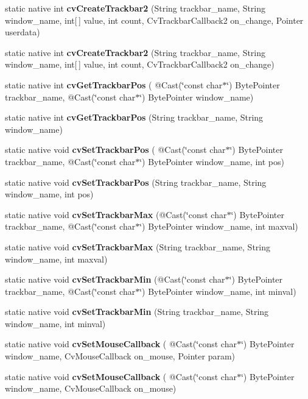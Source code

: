\begin{DoxyCompactItemize}
\item 
static native int {\bfseries cv\+Create\+Trackbar2} (String trackbar\+\_\+name, String window\+\_\+name, int\mbox{[}$\,$\mbox{]} value, int count, Cv\+Trackbar\+Callback2 on\+\_\+change, Pointer userdata)
\item 
static native int {\bfseries cv\+Create\+Trackbar2} (String trackbar\+\_\+name, String window\+\_\+name, int\mbox{[}$\,$\mbox{]} value, int count, Cv\+Trackbar\+Callback2 on\+\_\+change)
\item 
static native int {\bfseries cv\+Get\+Trackbar\+Pos} ( @Cast(\char`\"{}const char$\ast$\char`\"{}) Byte\+Pointer trackbar\+\_\+name, @Cast(\char`\"{}const char$\ast$\char`\"{}) Byte\+Pointer window\+\_\+name)
\item 
static native int {\bfseries cv\+Get\+Trackbar\+Pos} (String trackbar\+\_\+name, String window\+\_\+name)
\item 
static native void {\bfseries cv\+Set\+Trackbar\+Pos} ( @Cast(\char`\"{}const char$\ast$\char`\"{}) Byte\+Pointer trackbar\+\_\+name, @Cast(\char`\"{}const char$\ast$\char`\"{}) Byte\+Pointer window\+\_\+name, int pos)
\item 
static native void {\bfseries cv\+Set\+Trackbar\+Pos} (String trackbar\+\_\+name, String window\+\_\+name, int pos)
\item 
static native void {\bfseries cv\+Set\+Trackbar\+Max} (@Cast(\char`\"{}const char$\ast$\char`\"{}) Byte\+Pointer trackbar\+\_\+name, @Cast(\char`\"{}const char$\ast$\char`\"{}) Byte\+Pointer window\+\_\+name, int maxval)
\item 
static native void {\bfseries cv\+Set\+Trackbar\+Max} (String trackbar\+\_\+name, String window\+\_\+name, int maxval)
\item 
static native void {\bfseries cv\+Set\+Trackbar\+Min} (@Cast(\char`\"{}const char$\ast$\char`\"{}) Byte\+Pointer trackbar\+\_\+name, @Cast(\char`\"{}const char$\ast$\char`\"{}) Byte\+Pointer window\+\_\+name, int minval)
\item 
static native void {\bfseries cv\+Set\+Trackbar\+Min} (String trackbar\+\_\+name, String window\+\_\+name, int minval)
\item 
static native void {\bfseries cv\+Set\+Mouse\+Callback} ( @Cast(\char`\"{}const char$\ast$\char`\"{}) Byte\+Pointer window\+\_\+name, Cv\+Mouse\+Callback on\+\_\+mouse, Pointer param)
\item 
static native void {\bfseries cv\+Set\+Mouse\+Callback} ( @Cast(\char`\"{}const char$\ast$\char`\"{}) Byte\+Pointer window\+\_\+name, Cv\+Mouse\+Callback on\+\_\+mouse)

\end{DoxyCompactItemize}
